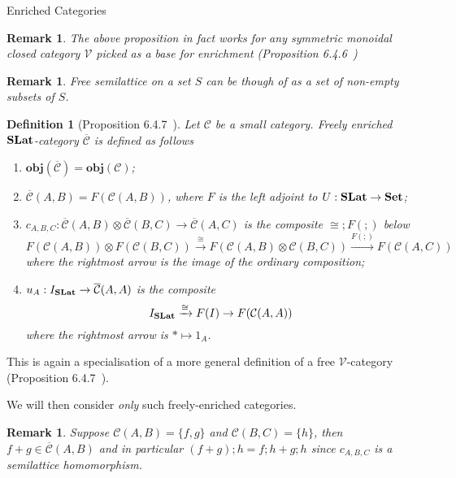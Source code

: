 \documentclass[acmsmall, screen, nonacm]{acmart}
\newcommand\obj[1]{{\textbf{obj}(#1)}}
\newtheorem{definition}[theorem]{Definition}
\newtheorem{remark}[theorem]{Remark}
\newcommand\enriched[1]{{\overline{\mathcal{#1}}}}
\begin{document}
\begin{section}{Enriched Categories}
\begin{remark}
  The above proposition in fact works for any symmetric monoidal closed category $\mathcal{V}$ picked as a base for enrichment (Proposition 6.4.6~\cite{Borceux_1994}) 
\end{remark}

\begin{remark}

  Free semilattice on a set $S$ can be though of as a set of non-empty subsets of $S$.
\end{remark}

\begin{definition}[Proposition 6.4.7~\cite{Borceux_1994}]
\label{def:free_slat}
  Let $\mathcal{C}$ be a small category.
  Freely enriched $\mathbf{SLat}$-category $\enriched{C}$ is defined as follows
  \begin{enumerate}
    \item $\obj{\enriched{C}} = \obj{\mathcal{C}}$;
    \item $\enriched{C}(A,B) = F(\mathcal{C}(A,B))$, where $F$ is the left adjoint to $U : \mathbf{SLat} \to \mathbf{Set}$;
    \item $c_{A,B,C} : \enriched{C}(A,B) \otimes \enriched{C}(B,C) \to \enriched{C}(A,C)$ is the composite $\cong ; F(;)$ below
    \[
    F(\mathcal{C}(A,B)) \otimes F(\mathcal{C}(B,C)) \xrightarrow{\cong} F(\mathcal{C}(A,B) \otimes \mathcal{C}(B,C)) \xrightarrow{F(;)} F(\mathcal{C}(A,C))
    \] 
    where the rightmost arrow is the image of the ordinary composition;
    \item $u_{A} : I_{\catname{SLat}} \to \enriched{C}(A,A)$ is the composite
    \[
    I_{\mathbf{SLat}} \xrightarrow{\cong} F(I) \to F(\mathcal{C}(A,A))
    \]
    where the rightmost arrow is $* \mapsto 1_{A}$.
  \end{enumerate}
\end{definition}

This is again a specialisation of a more general definition of a free $\mathcal{V}$-category (Proposition 6.4.7~\cite{Borceux_1994}).

We will then consider \textit{only} such freely-enriched categories.

\begin{remark}
  Suppose $\mathcal{C}(A,B) = \{f,g\}$ and $\mathcal{C}(B,C) = \{h\}$, then $f + g \in \enriched{C}(A,B)$ and in particular $(f+g);h = f;h + g;h$ since $c_{A,B,C}$ is a semilattice homomorphism.
\end{remark}


\end{section}
\end{document}

